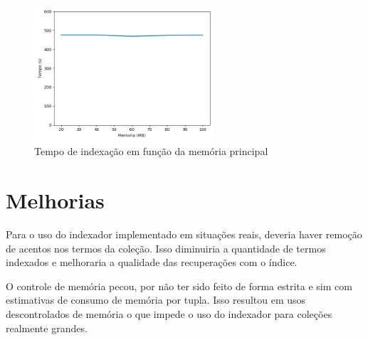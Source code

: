 \documentclass[paper=a4, fontsize=11pt]{scrartcl}
\numberwithin{equation}{section}		%
\numberwithin{figure}{section}			%
\numberwithin{table}{section}				%
\begin{document}
\begin{figure}
  \caption{Tempo de indexação em função da memória principal}
  \label{fig:memoria}
  \centering
    \includegraphics[width=0.6\textwidth]{memoria}
\end{figure}

\section{Melhorias}
Para o uso do indexador implementado em situações reais, deveria haver remoção de acentos nos termos da coleção. Isso diminuiria a quantidade de termos indexados e melhoraria a qualidade das recuperações com o índice. 

O controle de memória pecou, por não ter sido feito de forma estrita e sim com estimativas de consumo de memória por tupla. Isso resultou em usos descontrolados de memória o que impede o uso do indexador para coleções realmente grandes.

\end{document}
